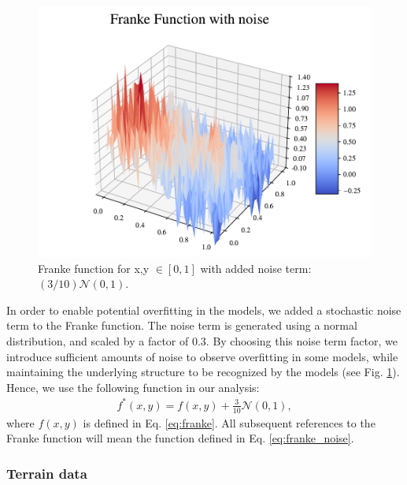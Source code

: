 \begin{figure}[h!]
\centering
\includegraphics[width=1\linewidth]{project_1_alt/figures/figures_in_report/franke_func_noise.pdf}
\caption{Franke function for x,y $\in [0,1]$ with added noise term: $(3/10) \mathcal{N}(0, 1)$.}
\label{fig:franke_noise}
\end{figure}

In order to enable potential overfitting in the models, we added a stochastic noise term to the Franke function. The noise term is generated using a normal distribution, and scaled by a factor of $0.3$. By choosing this noise term factor, we introduce sufficient amounts of noise to observe overfitting in some models, while maintaining the underlying structure to be recognized by the models (see Fig. \ref{fig:franke_noise}). Hence, we use the following function in our analysis:
\begin{align}\label{eq:franke_noise}
    f^*(x,y) = f(x, y) + \frac{3}{10} \mathcal{N}(0, 1),
\end{align}
where $f(x,y)$ is defined in Eq. \ref{eq:franke}. All subsequent references to the Franke function will mean the function defined in Eq. \ref{eq:franke_noise}.

\subsubsection{Terrain data}

